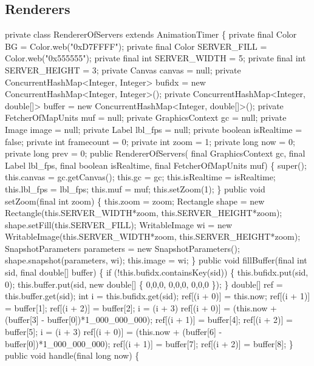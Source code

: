 \subsection{Renderers}
\nwenddocs{}\plusendmoddef
private class RendererOfServers extends AnimationTimer \{
  private final Color BG = Color.web("0xD7FFFF");
  private final Color SERVER_FILL = Color.web("0x555555");
  private final int SERVER_WIDTH = 5;
  private final int SERVER_HEIGHT = 3;
  private Canvas canvas = null;
  private ConcurrentHashMap<Integer, Integer>  bufidx =
      new ConcurrentHashMap<Integer, Integer>();
  private ConcurrentHashMap<Integer, double[]> buffer =
      new ConcurrentHashMap<Integer, double[]>();
  private FetcherOfMapUnits muf = null;
  private GraphicsContext gc = null;
  private Image image = null;
  private Label lbl_fps = null;
  private boolean isRealtime = false;
  private int framecount = 0;
  private int zoom = 1;
  private long now = 0;
  private long prev = 0;
  public RendererOfServers(
      final GraphicsContext gc, final Label lbl_fps, final boolean isRealtime,
      final FetcherOfMapUnits muf) \{
    super();
    this.canvas = gc.getCanvas();
    this.gc = gc;
    this.isRealtime = isRealtime;
    this.lbl_fps = lbl_fps;
    this.muf = muf;
    this.setZoom(1);
  \}
  public void setZoom(final int zoom) \{
    this.zoom = zoom;
    Rectangle shape = new Rectangle(this.SERVER_WIDTH*zoom, this.SERVER_HEIGHT*zoom);
    shape.setFill(this.SERVER_FILL);
    WritableImage wi = new WritableImage(this.SERVER_WIDTH*zoom, this.SERVER_HEIGHT*zoom);
    SnapshotParameters parameters = new SnapshotParameters();
    shape.snapshot(parameters, wi);
    this.image = wi;
  \}
  public void fillBuffer(final int sid, final double[] buffer) \{
    if (!this.bufidx.containsKey(sid)) \{
      this.bufidx.put(sid, 0);
      this.buffer.put(sid, new double[] \{ 0,0,0, 0,0,0, 0,0,0 \});
    \}
    double[] ref = this.buffer.get(sid);
    int i = this.bufidx.get(sid);
    ref[(i + 0)] = this.now;
    ref[(i + 1)] = buffer[1];
    ref[(i + 2)] = buffer[2];
    i = (i + 3) %
    ref[(i + 0)] = (this.now + (buffer[3] - buffer[0])*1_000_000_000);
    ref[(i + 1)] = buffer[4];
    ref[(i + 2)] = buffer[5];
    i = (i + 3) %
    ref[(i + 0)] = (this.now + (buffer[6] - buffer[0])*1_000_000_000);
    ref[(i + 1)] = buffer[7];
    ref[(i + 2)] = buffer[8];
  \}
  public void handle(final long now) \{
